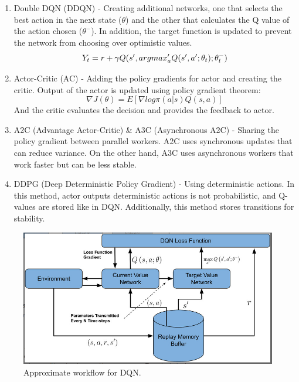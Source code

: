 \documentclass{IEEEcsmag}
\begin{document}
    \begin{enumerate}
        \item Double DQN (DDQN) - Creating additional networks, one that selects the best action in the next state ($\theta$) and the other that calculates the Q value of the action chosen ($\theta^-$). In addition, the target function is updated to prevent the network from choosing over optimistic values.
        \[
            Y_t = r+\gamma Q(s',arg\space max_a'Q(s',a';\theta_t);\theta^-_t)
        \]
        \item Actor-Critic (AC) - Adding the policy gradients for actor and creating the critic. Output of the actor is updated using policy gradient theorem:
        \[
            \nabla J(\theta) = E[\nabla log\pi(a|s)Q(s,a)]
        \]
        And the critic evaluates the decision and provides the feedback to actor.
        \item A2C (Advantage Actor-Critic) \& A3C (Asynchronous A2C) - Sharing the policy gradient between parallel workers.
        A2C uses synchronous updates that can reduce variance.
        On the other hand, A3C uses asynchronous workers that work faster but can be less stable.
        \item DDPG (Deep Deterministic Policy Gradient) - Using deterministic actions.
        In this method, actor outputs deterministic actions is not  probabilistic, and Q-values are stored like in DQN.
        Additionally, this method stores transitions for stability.
    \end{enumerate}
    
    \begin{figure}
        \centering
        \includegraphics[width=\linewidth]{images/Cite-12-img-1.png}
        \caption{Approximate workflow for DQN.}
        \label{fig:enter-label}
    \end{figure}
\end{document}
